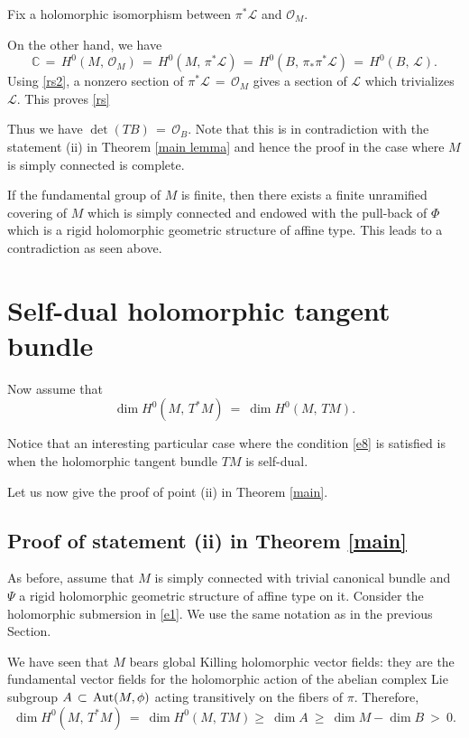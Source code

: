 \documentclass[12pt,reqno]{amsart}
\theoremstyle{definition}
\numberwithin{equation}{section}
\begin{document}
Fix a holomorphic isomorphism
between $\pi^*\mathcal L$ and ${\mathcal O}_M$.

On the other hand, we have
\begin{equation}\label{rs2}
{\mathbb C}\,=\, H^0(M,\, {\mathcal O}_M) \, =\, H^0(M, \, \pi^* {\mathcal L})\,=\, H^0(B,\,
\pi_*\pi^*{\mathcal L})\, =\, H^0(B,\, {\mathcal L}).
\end{equation}
Using \eqref{rs2}, a nonzero section of $\pi^* {\mathcal L}\,=\, {\mathcal O}_M$ gives
a section of $\mathcal L$ which trivializes $\mathcal L$. This proves \eqref{rs}

Thus we have $\det (TB)\,=\, {\mathcal O}_B$. Note that
this is in contradiction with the statement (ii) in Theorem \ref{main lemma} and hence
the proof in the case where $M$ is simply connected is complete.

If the fundamental group of $M$ is finite, then there exists a finite unramified covering of $M$ which is 
simply connected and endowed with the pull-back of $\Phi$ which is a rigid holomorphic geometric structure 
of affine type. This leads to a contradiction as seen above.

\section{Self-dual holomorphic tangent bundle} \label{section self-dual} 

Now assume that
\begin{equation}\label{e8}
\dim H^0(M,\, T^*M) \ =\ \dim H^0(M,\, TM).
\end{equation}

Notice that an interesting particular case where the condition \eqref{e8} is satisfied is when the 
holomorphic tangent bundle $TM$ is self-dual.

Let us now give the proof of point (ii) in Theorem \ref{main}.

\subsection{Proof of statement (ii) in Theorem \ref{main}}\label{sest2}

As before, assume that $M$ is simply connected with trivial canonical bundle and $\Psi$ a rigid holomorphic 
geometric structure of affine type on it. Consider the holomorphic submersion in \eqref{e1}. We use the 
same notation as in the previous Section.

We have seen that $M$ bears global Killing holomorphic vector fields: they are the fundamental vector 
fields for the holomorphic action of the abelian complex Lie subgroup $A \, \subset\, {\rm Aut}(M, \phi)$
acting transitively on the fibers of $\pi$. Therefore,
$$\dim H^0(M,\, T^*M) \ =\ \dim H^0(M,\, TM) \geq \ \dim A \ \geq \ \dim M - \dim B\ >\ 0.$$
\end{document}
